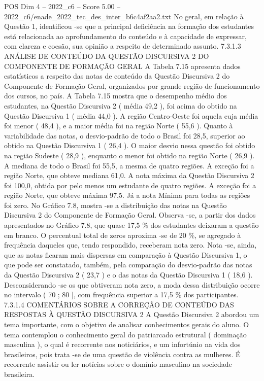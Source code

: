 \begin{textsample}{POS Dim 4 – 2022\_c6 – Score 5.00 – 2022\_c6/enade\_2022\_tec\_des\_inter\_b6c4af2aa2.txt}
No geral, em relação à Questão 1, identificou -se que a principal deficiência na formação dos estudantes está relacionada ao aprofundamento do conteúdo e à capacidade de expressar, com clareza e coesão, sua opinião a respeito de determinado assunto. 7.3.1.3 ANÁLISE DE CONTEÚDO DA QUESTÃO DISCURSIVA 2 DO COMPONENTE DE FORMAÇÃO GERAL A Tabela 7.15 apresenta dados estatísticos a respeito das notas de conteúdo da Questão Discursiva 2 do Componente de Formação Geral, organizados por grande região de funcionamento dos cursos, no país.
A Tabela 7.15 mostra que o desempenho médio dos estudantes, na Questão Discursiva 2 ( média 49,2 ), foi acima do obtido na Questão Discursiva 1 ( média 44,0 ).
A região Centro-Oeste foi aquela cuja média foi menor ( 48,4 ), e a maior média foi na região Norte ( 55,6 ).
Quanto à variabilidade das notas, o desvio-padrão de todo o Brasil foi 28,5, superior ao obtido na Questão Discursiva 1 ( 26,4 ).
O maior desvio nessa questão foi obtido na região Sudeste ( 28,9 ), enquanto o menor foi obtido na região Norte ( 26,9 ).
A mediana de todo o Brasil foi 55,5, a mesma de quatro regiões.
A exceção foi a região Norte, que obteve mediana 61,0.
A nota máxima da Questão Discursiva 2 foi 100,0, obtida por pelo menos um estudante de quatro regiões.
A exceção foi a região Norte, que obteve máxima 97,5.
Já a nota Mínima para todas as regiões foi zero.
No Gráfico 7.8, mostra -se a distribuição das notas na Questão Discursiva 2 do Componente de Formação Geral.
Observa -se, a partir dos dados apresentados no Gráfico 7.8, que quase 17,5 \% dos estudantes deixaram a questão em branco.
O percentual total de zeros aproxima -se de 20 \%, se agregado à frequência daqueles que, tendo respondido, receberam nota zero.
Nota -se, ainda, que as notas ficaram mais dispersas em comparação à Questão Discursiva 1, o que pode ser constatado, também, pela comparação do desvio-padrão das notas da Questão Discursiva 2 ( 23,7 ) e o das notas da Questão Discursiva 1 ( 18,6 ).
Desconsiderando -se os que obtiveram nota zero, a moda dessa distribuição ocorre no intervalo ( 70 ; 80 ], com frequência superior a 17,5 \% dos participantes. 7.3.1.4 COMENTÁRIOS SOBRE A CORREÇÃO DE CONTEÚDO DAS RESPOSTAS À QUESTÃO DISCURSIVA 2 A Questão Discursiva 2 abordou um tema importante, com o objetivo de analisar conhecimentos gerais do aluno.
O tema contemplou o conhecimento geral do patriarcado estrutural ( dominação masculina ), o qual é recorrente nos noticiários, e um infortúnio na vida dos brasileiros, pois trata -se de uma questão de violência contra as mulheres.
É recorrente assistir ou ler notícias sobre o domínio masculino na sociedade brasileira.

\end{textsample}
